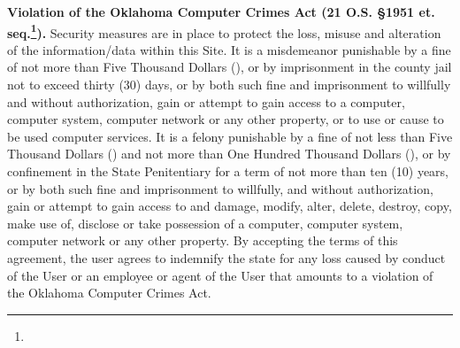 \textbf{%
    Violation of the Oklahoma Computer Crimes Act
    (21 O.S. \S1951 et. seq.\footnote{\OklahomaComputerCrimesActFootnote}).%
}
Security measures are in place to protect the loss, misuse and alteration of the
information/data within this Site. It is a misdemeanor punishable by a fine of
not more than Five Thousand Dollars (), or by imprisonment in the
county jail not to exceed thirty (30) days, or by both such fine and
imprisonment to willfully and without authorization, gain or attempt to gain
access to a computer, computer system, computer network or any other property,
or to use or cause to be used computer services. It is a felony punishable by a
fine of not less than Five Thousand Dollars () and not more than One
Hundred Thousand Dollars (), or by confinement in the State
Penitentiary for a term of not more than ten (10) years, or by both such fine
and imprisonment to willfully, and without authorization, gain or attempt to
gain access to and damage, modify, alter, delete, destroy, copy, make use of,
disclose or take possession of a computer, computer system, computer network or
any other property. By accepting the terms of this agreement, the user agrees to
indemnify the state for any loss caused by conduct of the User or an employee or
agent of the User that amounts to a violation of the Oklahoma Computer Crimes
Act.
